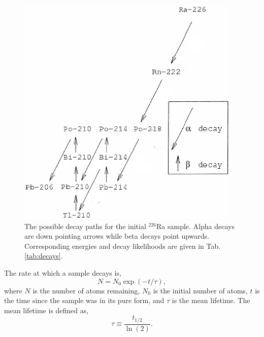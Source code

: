 \documentclass[10pt]{IEEEtran}
\begin{document}
    \begin{figure}[!h]
        \begin{center}
        \includegraphics[width=\columnwidth]{chain.png}
       \caption{The possible decay paths for the initial $^{226}$Ra sample. Alpha decays are down pointing arrows while beta decays point upwards. Corresponding energies and decay likelihoods are given in Tab. \ref{tab:decays}\cite{blackboard}.}
        \label{fig:chain}
        \end{center}
    \end{figure}
    
The rate at which a sample decays is\cite{blackboard},
	\begin{equation}
		N = N_0 \exp(-t/\tau),
	\end{equation}
where $N$ is the number of atoms remaining, $N_0$ is the initial number of atoms, $t$ is the time since the sample was in its pure form, and $\tau$ is the mean lifetime. The mean lifetime is defined as,
	\begin{equation}
		\tau \equiv \frac{t_{1/2}}{\ln(2)}.
	\end{equation}
\end{document}
